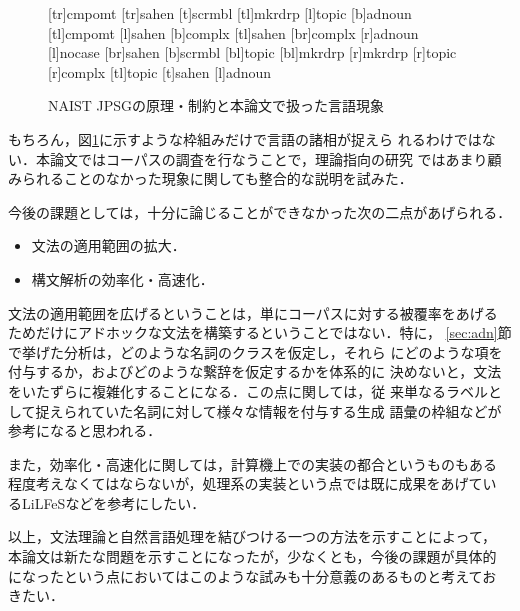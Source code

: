 \begin{figure}
\begin{center}
{\begin{picture}
\end{picture}}
\end{center}
[tr]{cmpomt}
[tr]{sahen}
[t]{scrmbl}
[tl]{mkrdrp}
[l]{topic}
[b]{adnoun}
[tl]{cmpomt}
[l]{sahen}
[b]{complx}
[tl]{sahen}
[br]{complx}
[r]{adnoun}
[l]{nocase}
[br]{sahen}
[b]{scrmbl}
[bl]{topic}
[bl]{mkrdrp}
[r]{mkrdrp}
[r]{topic}
[r]{complx}
[tl]{topic}
[t]{sahen}
{\makedash{2pt}
[l]{adnoun}}
\caption{NAIST JPSGの原理・制約と本論文で扱った言語現象}
\label{fig:overview}
\end{figure}

もちろん，図\ref{fig:overview}に示すような枠組みだけで言語の諸相が捉えら
れるわけではない．本論文ではコーパスの調査を行なうことで，理論指向の研究
ではあまり顧みられることのなかった現象に関しても整合的な説明を試みた．

今後の課題としては，十分に論じることができなかった次の二点があげられる．
\begin{itemize}
 \item [1.] 文法の適用範囲の拡大．
 \item [2.] 構文解析の効率化・高速化．
\end{itemize}
文法の適用範囲を広げるということは，単にコーパスに対する被覆率をあげる
ためだけにアドホックな文法を構築するということではない．特に，
\ref{sec:adn}節で挙げた分析は，どのような名詞のクラスを仮定し，それら
にどのような項を付与するか，およびどのような繋辞を仮定するかを体系的に
決めないと，文法をいたずらに複雑化することになる．この点に関しては，従
来単なるラベルとして捉えられていた名詞に対して様々な情報を付与する生成
語彙\cite{Pustejovsky1995}の枠組などが参考になると思われる．

また，効率化・高速化に関しては，計算機上での実装の都合というものもある
程度考えなくてはならないが，処理系の実装という点では既に成果をあげてい
るLiLFeS\cite{Makino&etal1998}などを参考にしたい．

以上，文法理論と自然言語処理を結びつける一つの方法を示すことによって，
本論文は新たな問題を示すことになったが，少なくとも，今後の課題が具体的
になったという点においてはこのような試みも十分意義のあるものと考えてお
きたい．







